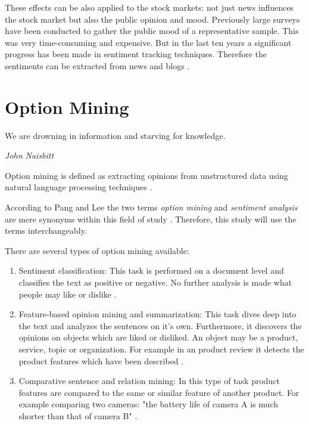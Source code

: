 These effects can be also applied to the stock markets: not just news influences the stock market but also the public opinion and mood.
Previously large surveys have been conducted to gather the public mood of a representative sample.
This was very time-consuming and expensive.
But in the last ten years a significant progress has been made in sentiment tracking techniques.
Therefore the sentiments can be extracted from news and blogs
\citep{Bollen2011a}.

\section{Option Mining} 
\label{s:background-optionmining}

\epigraph{We are drowning in information and starving for knowledge.}{\textit{John Naisbitt}}

Option mining is defined as extracting opinions from unstructured data using natural language processing techniques \citep[page 411]{Liu2007}.

According to Pang and Lee the two terms \emph{option mining} and \emph{sentiment analysis} are mere synonyms within this field of study \citep{Pang2008c}.
Therefore, this study will use the terms interchangeably.

There are several types of option mining available:

\begin{enumerate}
	\item 
	Sentiment classification: 
	This task is performed on a document level and classifies the text as positive or negative. 
	No further analysis is made what people may like or dislike 
	\citep[page 411]{Liu2007}.
	
	\item 
	Feature-based opinion mining and summarization: 
	This task dives deep into the text and analyzes the sentences on it's own.
	Furthermore, it discovers the opinions on objects which are liked or disliked.
	An object may be a product, service, topic or organization. 
	For example in an product review it detects the product features which have been described 
	\citep[page 412]{Liu2007}.
	
	\item
	Comparative sentence and relation mining:
	In this type of task product features are compared to the same or similar feature of another product.
	For example comparing two cameras: "the battery life of camera A is much shorter than that of camera B" 
	\citep[page 412]{Liu2007}. 
\end{enumerate}

